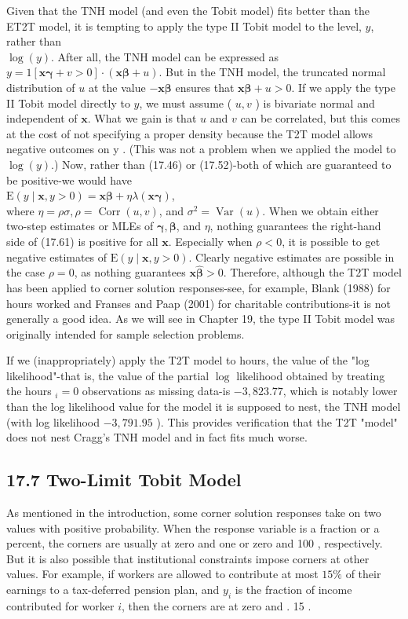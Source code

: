 \documentclass[10pt]{article}
\begin{document}
Given that the TNH model (and even the Tobit model) fits better than the ET2T model, it is tempting to apply the type II Tobit model to the level, $y$, rather than\\
$\log (y)$. After all, the TNH model can be expressed as $y=1[\mathbf{x} \boldsymbol{\gamma}+v>0] \cdot(\mathbf{x} \boldsymbol{\beta}+u)$. But in the TNH model, the truncated normal distribution of $u$ at the value $-\mathbf{x} \boldsymbol{\beta}$ ensures that $\mathbf{x} \boldsymbol{\beta}+u>0$. If we apply the type II Tobit model directly to $y$, we must assume ( $u, v$ ) is bivariate normal and independent of $\mathbf{x}$. What we gain is that $u$ and $v$ can be correlated, but this comes at the cost of not specifying a proper density because the T2T model allows negative outcomes on y . (This was not a problem when we applied the model to $\log (y)$.) Now, rather than (17.46) or (17.52)-both of which are guaranteed to be positive-we would have\\
$\mathrm{E}(y \mid \mathbf{x}, y>0)=\mathbf{x} \boldsymbol{\beta}+\eta \lambda(\mathbf{x} \boldsymbol{\gamma})$,\\
where $\eta=\rho \sigma, \rho=\operatorname{Corr}(u, v)$, and $\sigma^{2}=\operatorname{Var}(u)$. When we obtain either two-step estimates or MLEs of $\boldsymbol{\gamma}, \boldsymbol{\beta}$, and $\eta$, nothing guarantees the right-hand side of (17.61) is positive for all $\mathbf{x}$. Especially when $\rho<0$, it is possible to get negative estimates of $\mathrm{E}(y \mid \mathbf{x}, y>0)$. Clearly negative estimates are possible in the case $\rho=0$, as nothing guarantees $\mathbf{x} \hat{\boldsymbol{\beta}}>0$. Therefore, although the T2T model has been applied to corner solution responses-see, for example, Blank (1988) for hours worked and Franses and Paap (2001) for charitable contributions-it is not generally a good idea. As we will see in Chapter 19, the type II Tobit model was originally intended for sample selection problems.

If we (inappropriately) apply the T2T model to hours, the value of the "log likelihood"-that is, the value of the partial $\log$ likelihood obtained by treating the hours $_{i}=0$ observations as missing data-is $-3,823.77$, which is notably lower than the log likelihood value for the model it is supposed to nest, the TNH model (with log likelihood $-3,791.95$ ). This provides verification that the T2T "model" does not nest Cragg's TNH model and in fact fits much worse.

\subsection*{17.7 Two-Limit Tobit Model}
As mentioned in the introduction, some corner solution responses take on two values with positive probability. When the response variable is a fraction or a percent, the corners are usually at zero and one or zero and 100 , respectively. But it is also possible that institutional constraints impose corners at other values. For example, if workers are allowed to contribute at most $15 \%$ of their earnings to a tax-deferred pension plan, and $y_{i}$ is the fraction of income contributed for worker $i$, then the corners are at zero and . 15 .
\end{document}
